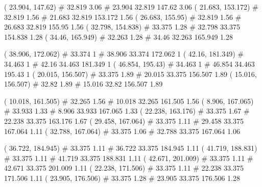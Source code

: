 \documentclass[a4paper,openbib,10pt]{article}
\newenvironment{treegraph}{\begin{graph}}{\end{graph}}
\begin{document}
\begin{treegraph}
  ( 23.904, 147.62) #     32.819    3.06
   #    23.904    32.819    147.62    3.06
  ( 21.683, 153.172) #     32.819    1.56
   #    21.683    32.819    153.172    1.56
  ( 26.683, 155.95) #     32.819    1.56
   #    26.683    32.819    155.95    1.56
  ( 32.798, 154.838) #     33.375    1.28
   #    32.798    33.375    154.838    1.28
  ( 34.46, 165.949) #     32.263    1.28
   #    34.46    32.263    165.949    1.28

  ( 38.906, 172.062) #     33.374    1
   #    38.906    33.374    172.062    1
  ( 42.16, 181.349) #     34.463    1
   #    42.16    34.463    181.349    1
  ( 46.854, 195.43) #     34.463    1
   #    46.854    34.463    195.43    1
  ( 20.015, 156.507) #     33.375    1.89
   #    20.015    33.375    156.507    1.89
  ( 15.016, 156.507) #     32.82    1.89
   #    15.016    32.82    156.507    1.89

  ( 10.018, 161.505) #     32.265    1.56
   #    10.018    32.265    161.505    1.56
  ( 8.906, 167.065) #     33.933    1.33
   #    8.906    33.933    167.065    1.33
  ( 22.238, 163.176) #     33.375    1.67
   #    22.238    33.375    163.176    1.67
  ( 29.458, 167.064) #     33.375    1.11
   #    29.458    33.375    167.064    1.11
  ( 32.788, 167.064) #     33.375    1.06
   #    32.788    33.375    167.064    1.06

  ( 36.722, 184.945) #     33.375    1.11
   #    36.722    33.375    184.945    1.11
  ( 41.719, 188.831) #     33.375    1.11
   #    41.719    33.375    188.831    1.11
  ( 42.671, 201.009) #     33.375    1.11
   #    42.671    33.375    201.009    1.11
  ( 22.238, 171.506) #     33.375    1.11
   #    22.238    33.375    171.506    1.11
  ( 23.905, 176.506) #     33.375    1.28
   #    23.905    33.375    176.506    1.28


\end{treegraph}
\end{document}
